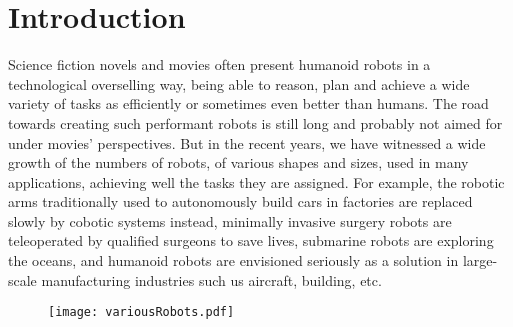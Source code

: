 


\chapter*{Introduction}
\label{cha:introduction}

\graphicspath{{Chapter0-Introduction/Figs/Vector/}{Chapter0-Introduction/Figs/}}

Science fiction novels and movies often present humanoid robots in a technological overselling way, being able to reason, plan and achieve a wide variety of tasks as efficiently or sometimes even better than humans.
The road towards creating such performant robots is still long and probably not aimed for under movies' perspectives. But in the recent years, we have witnessed a wide growth of the numbers of robots, of various shapes and sizes, used in many applications, achieving well the tasks they are assigned.
For example, the robotic arms traditionally used to autonomously build cars in factories are replaced slowly by cobotic systems instead, minimally invasive surgery robots are teleoperated by qualified surgeons to save lives, submarine robots are exploring the oceans, and humanoid robots are envisioned seriously as a solution in large-scale manufacturing industries such us aircraft, building, etc.

\begin{figure}[ht]
  \centering
  \texttt{[image: variousRobots.pdf]}
\label{fig:various}
\end{figure}

